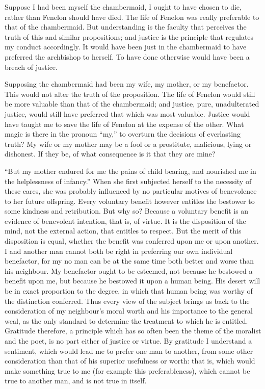 Suppose I had been myself the chambermaid, I ought to have chosen to
die, rather than Fenelon should have died. The life of Fenelon was
really preferable to that of the chambermaid. But understanding is the
faculty that perceives the truth of this and similar propositions; and
justice is the principle that  regulates my conduct
accordingly. It would have been just in the chambermaid to have
preferred the archbishop to herself. To have done otherwise would have
been a breach of justice.

Supposing the chambermaid had been my wife, my mother, or my
benefactor. This would not alter the truth of the proposition. The
life of Fenelon would still be more valuable than that of the
chambermaid; and justice, pure, unadulterated justice, would still
have preferred that which was most valuable. Justice would have taught
me to save the life of Fenelon at the expense of the other. What magic
is there in the pronoun ``my,'' to overturn the decisions of
everlasting truth? My wife or my mother may be a fool or a prostitute,
malicious, lying or dishonest. If they be, of what consequence is it
that they are mine?

``But my mother endured for me the pains of child bearing, and
nourished me in the helplessness of infancy.'' When she first
subjected herself to the necessity of these cares, she was probably
influenced by no particular motives of benevolence to her future
offspring. Every voluntary benefit however entitles the bestower to
some kindness and retribution. But why so? Because a voluntary benefit
is an evidence of benevolent intention, that is, of virtue. It is the
disposition of the mind, not the external action, that entitles to
respect. But the merit of this disposition is equal, whether the
benefit was conferred upon me or upon another. I and another man
cannot both be right in preferring  our own individual
benefactor, for my no man can be at the same time both better and
worse than his neighbour. My benefactor ought to be esteemed, not
because he bestowed a benefit upon me, but because he bestowed it upon
a human being. His desert will be in exact proportion to the degree,
in which that human being was worthy of the distinction conferred.
Thus every view of the subject brings us back to the consideration of
my neighbour's moral worth and his importance to the general weal, as
the only standard to determine the treatment to which he is
entitled. Gratitude therefore, a principle which has so often been the
theme of the moralist and the poet, is no part either of justice or
virtue. By gratitude I understand a sentiment, which would lead me to
prefer one man to another, from some other consideration than that of
his superior usefulness or worth: that is, which would make something
true to me (for example this preferableness), which cannot be true to
another man, and is not true in itself.

